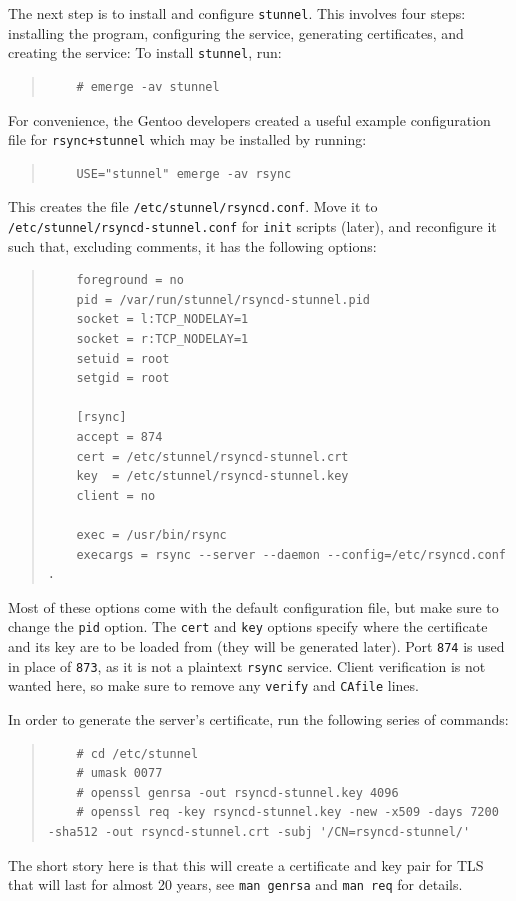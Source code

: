 \documentclass{article}
\begin{document}
The next step is to install and configure \texttt{stunnel}.  This involves four steps: installing the program, configuring the service, generating certificates, and creating the service: To install \texttt{stunnel}, run:
\begin{quote}
\begin{verbatim}
	# emerge -av stunnel
\end{verbatim}
\end{quote}
For convenience, the Gentoo developers created a useful example configuration file for \texttt{rsync+stunnel} which may be installed by running:
\begin{quote}
\begin{verbatim}
	USE="stunnel" emerge -av rsync
\end{verbatim}
\end{quote}
This creates the file \texttt{/etc/stunnel/rsyncd.conf}.  Move it to \texttt{/etc/stunnel/rsyncd-stunnel.conf} for \texttt{init} scripts (later), and reconfigure it such that, excluding comments, it has the following options:
\begin{quote}
\begin{verbatim}
	foreground = no
	pid = /var/run/stunnel/rsyncd-stunnel.pid
	socket = l:TCP_NODELAY=1
	socket = r:TCP_NODELAY=1
	setuid = root
	setgid = root

	[rsync]
	accept = 874
	cert = /etc/stunnel/rsyncd-stunnel.crt
	key  = /etc/stunnel/rsyncd-stunnel.key
	client = no

	exec = /usr/bin/rsync
	execargs = rsync --server --daemon --config=/etc/rsyncd.conf .
\end{verbatim}
\end{quote}
Most of these options come with the default configuration file, but make sure to change the \texttt{pid} option.  The \texttt{cert} and \texttt{key} options specify where the  certificate and its key are to be loaded from (they will be generated later).  Port \texttt{874} is used in place of \texttt{873}, as it is not a plaintext \texttt{rsync} service.  Client verification is not wanted here, so make sure to remove any \texttt{verify} and \texttt{CAfile} lines.

In order to generate the server's certificate, run the following series of commands:
\begin{quote}
\begin{verbatim}
	# cd /etc/stunnel
	# umask 0077
	# openssl genrsa -out rsyncd-stunnel.key 4096
	# openssl req -key rsyncd-stunnel.key -new -x509 -days 7200 -sha512 -out rsyncd-stunnel.crt -subj '/CN=rsyncd-stunnel/'
\end{verbatim}
\end{quote}
The short story here is that this will create a certificate and key pair for TLS that will last for almost 20 years, see \texttt{man genrsa} and \texttt{man req} for details.
\end{document}
